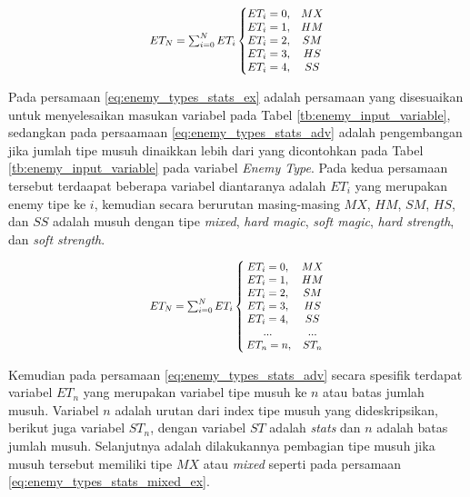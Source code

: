 \begin{equation}\label{eq:enemy_types_stats_ex}
\resizebox{0.4\textwidth}{!}{%
	$ET_{N} = \sum_{i= 0}^{N} ET_{i} \left\{\begin{matrix}
	ET_{i} = 0, & MX\\ 
	ET_{i} = 1, & HM\\ 
	ET_{i} = 2, & SM\\ 
	ET_{i} = 3, & HS\\ 
	ET_{i} = 4, & SS
	\end{matrix}\right.$%
}
\end{equation}

Pada persamaan \ref{eq:enemy_types_stats_ex} adalah persamaan yang disesuaikan untuk menyelesaikan masukan variabel pada Tabel \ref{tb:enemy_input_variable}, sedangkan pada persaamaan \ref{eq:enemy_types_stats_adv} adalah pengembangan jika jumlah tipe musuh dinaikkan lebih dari yang dicontohkan pada Tabel \ref{tb:enemy_input_variable} pada variabel \textit{Enemy Type}. Pada kedua persamaan tersebut terdaapat beberapa variabel diantaranya adalah $ET_{i}$ yang merupakan enemy tipe ke $i$, kemudian secara berurutan masing-masing $MX$, $HM$, $SM$, $HS$, dan $SS$ adalah musuh dengan tipe \textit{mixed}, \textit{hard magic}, \textit{soft magic}, \textit{hard strength}, dan \textit{soft strength}.
\vspace{1ex}

\begin{equation}\label{eq:enemy_types_stats_adv}
\resizebox{0.4\textwidth}{!}{%
	$ET_{N} = \sum_{i= 0}^{N} ET_{i} \left\{\begin{matrix}
	ET_{i} = 0, & MX\\ 
	ET_{i} = 1, & HM\\ 
	ET_{i} = 2, & SM\\ 
	ET_{i} = 3, & HS\\ 
	ET_{i} = 4, & SS\\
	... & ... \\
	\hspace{0.2em} ET_{n} = n, & ST_{n}
	\end{matrix}\right.$%
}
\end{equation}

Kemudian pada persamaan \ref{eq:enemy_types_stats_adv} secara spesifik terdapat variabel $ET_{n}$ yang merupakan variabel tipe musuh ke $n$ atau batas jumlah musuh. Variabel $n$ adalah urutan dari index tipe musuh yang dideskripsikan, berikut juga variabel $ST_{n}$, dengan variabel $ST$ adalah \textit{stats} dan $n$ adalah batas jumlah musuh. Selanjutnya adalah dilakukannya pembagian tipe musuh jika musuh tersebut memiliki tipe $MX$ atau \textit{mixed} seperti pada persamaan \ref{eq:enemy_types_stats_mixed_ex}.
\vspace{1ex}

